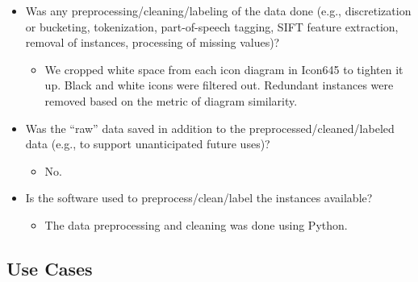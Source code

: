 \documentclass{article}
\begin{document}
\begin{itemize}
    \item Was any preprocessing/cleaning/labeling of the data done (e.g.,
discretization or bucketing, tokenization, part-of-speech tagging,
SIFT feature extraction, removal of instances, processing of missing values)?
    \begin{itemize}
        \item We cropped white space from each icon diagram in Icon645 to tighten it up. Black and white icons were filtered out. Redundant instances were removed based on the metric of diagram similarity.
    \end{itemize}
    \item Was the “raw” data saved in addition to the preprocessed/cleaned/labeled
data (e.g., to support unanticipated future uses)?
    \begin{itemize}
        \item No.
    \end{itemize}
    \item Is the software used to preprocess/clean/label the instances available?
    \begin{itemize}
        \item The data preprocessing and cleaning was done using Python.
    \end{itemize}
    
\end{itemize}

\subsection{Use Cases}
\end{document}
